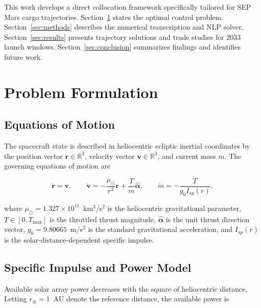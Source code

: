 \documentclass{aiaa-tc}
\begin{document}
This work develops a direct collocation framework specifically tailored for
SEP Mars cargo trajectories.  Section~\ref{sec:formulation} states the
optimal control problem.  Section~\ref{sec:methods} describes the numerical
transcription and NLP solver.  Section~\ref{sec:results} presents trajectory
solutions and trade studies for 2033 launch windows.  Section~\ref{sec:conclusion}
summarizes findings and identifies future work.

\section{Problem Formulation}
\label{sec:formulation}

\subsection{Equations of Motion}

The spacecraft state is described in heliocentric ecliptic inertial
coordinates by the position vector $\mathbf{r} \in \mathbb{R}^3$, velocity
vector $\mathbf{v} \in \mathbb{R}^3$, and current mass $m$.  The governing
equations of motion are

\begin{equation}
  \dot{\mathbf{r}} = \mathbf{v},
  \qquad
  \dot{\mathbf{v}} = -\frac{\mu_\odot}{r^3}\mathbf{r}
                     + \frac{T}{m}\hat{\boldsymbol{\alpha}},
  \qquad
  \dot{m} = -\frac{T}{g_0 I_{sp}(r)},
  \label{eq:eom}
\end{equation}

\noindent where $\mu_\odot = 1.327 \times 10^{11}$~km$^3$/s$^2$ is the
heliocentric gravitational parameter, $T \in [0, T_{\max}]$ is the throttled
thrust magnitude, $\hat{\boldsymbol{\alpha}}$ is the unit thrust direction
vector, $g_0 = 9.80665$~m/s$^2$ is the standard gravitational acceleration,
and $I_{sp}(r)$ is the solar-distance-dependent specific impulse.

\subsection{Specific Impulse and Power Model}

Available solar array power decreases with the square of heliocentric distance.
Letting $r_\oplus = 1$~AU denote the reference distance, the available power is
\end{document}
